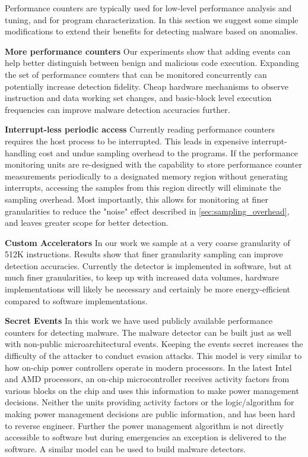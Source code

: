 \documentclass{acm_proc_article-sp}
\begin{document}
Performance counters are typically used for low-level performance
analysis and tuning, and for program characterization. In this
section we suggest some simple modifications to extend their benefits
for detecting malware based on anomalies.

\textbf{More performance counters} \space\space Our experiments show that
adding events can help better distinguish between benign and malicious
code execution. Expanding the set of performance counters that can
be monitored concurrently can potentially increase detection fidelity.
Cheap hardware mechanisms to observe instruction and data working
set changes, and basic-block level execution frequencies can improve
malware detection accuracies further.

\textbf{Interrupt-less periodic access} \space\space Currently reading
performance counters requires the host process to be interrupted.
This leads in expensive interrupt-handling cost and undue sampling
overhead to the programs. If the performance monitoring units are
re-designed with the capability to store performance counter
measurements periodically to a designated memory region without
generating interrupts, accessing the samples from this region
directly will eliminate the sampling overhead. Most importantly,
this allows for monitoring at finer granularities to reduce the
"noise" effect described in \ref{sec:sampling_overhead}, and leaves
greater scope for better detection.

\textbf{Custom Accelerators} \space\space In our work we sample at a very
coarse granularity of 512K instructions. Results show that finer
granularity sampling can improve detection accuracies. Currently
the detector is implemented in software, but at much finer
granularities, to keep up with increased data volumes, hardware
implementations will likely be necessary and certainly be more
energy-efficient compared to software implementations.

\textbf{Secret Events} \space\space In this work we have used publicly available
performance counters for detecting malware. The malware detector
can be built just as well with non-public microarchitectural events.
Keeping the events secret increases the difficulty of the attacker
to conduct evasion attacks.  This model is very similar to how
on-chip power controllers operate in modern processors.  In the
latest Intel and AMD processors, an on-chip microcontroller receives
activity factors from various blocks on the chip and uses this
information to make power management
decisions.
Neither the units providing activity factors or the logic/algorithm
for making power management decisions are public information, and
has been hard to reverse engineer.  Further the power management
algorithm is not directly accessible to software but during emergencies
an exception is delivered to the software. A similar model can be
used to build malware detectors.
\end{document}
